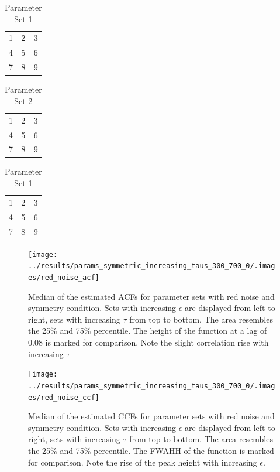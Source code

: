\documentclass[a4paper,12pt]{book}
\theoremstyle{break}
\begin{document}
\begin{table}\label{t/a/parameterSet1}
\begin{tabular}{ l | c | r }
		1 & 2 & 3 \\
		4 & 5 & 6 \\
		7 & 8 & 9 \\
		\hline  
	\end{tabular}
	\caption{\label{tab:table-name} Parameter Set 1}
\end{table}

\begin{table}\label{t/a/parameterSet2}
	\begin{tabular}{ l | c | r }
		1 & 2 & 3 \\
		4 & 5 & 6 \\
		7 & 8 & 9 \\
		\hline  
	\end{tabular}
	\caption{\label{tab:table-name} Parameter Set 2}
\end{table}

\begin{table}\label{t/a/parameterSet3}
	\begin{tabular}{ l | c | r }
		1 & 2 & 3 \\
		4 & 5 & 6 \\
		7 & 8 & 9 \\
		\hline  
	\end{tabular}
	\caption{\label{tab:table-name} Parameter Set 1}
\end{table}

\begin{figure}[htp]
	\texttt{[image: ../results/params\_symmetric\_increasing\_taus\_300\_700\_0/.images/red\_noise\_acf]}%
	\caption{Median of the estimated ACFs for parameter sets with red noise and symmetry condition. Sets with increasing $\epsilon$ are displayed from left to right, sets with increasing $\tau$ from top to bottom. The area resembles the 25\% and 75\% percentile. The height of the function at a lag of 0.08 is marked for comparison. Note the slight correlation rise with increasing $\tau$ }%
	\label{f/a/acf_red_sym}%
\end{figure}

\begin{figure}[htp]
	\texttt{[image: ../results/params\_symmetric\_increasing\_taus\_300\_700\_0/.images/red\_noise\_ccf]}%
	\caption{Median of the estimated CCFs for parameter sets with red noise and symmetry condition. Sets with increasing $\epsilon$ are displayed from left to right, sets with increasing $\tau$ from top to bottom. The area resembles the 25\% and 75\% percentile. The \ac{FWAHH} of the function is marked for comparison. Note the rise of the peak height with increasing $\epsilon$. }%
	\label{f/a/ccf_red_sym}
\end{figure}
\end{document}
